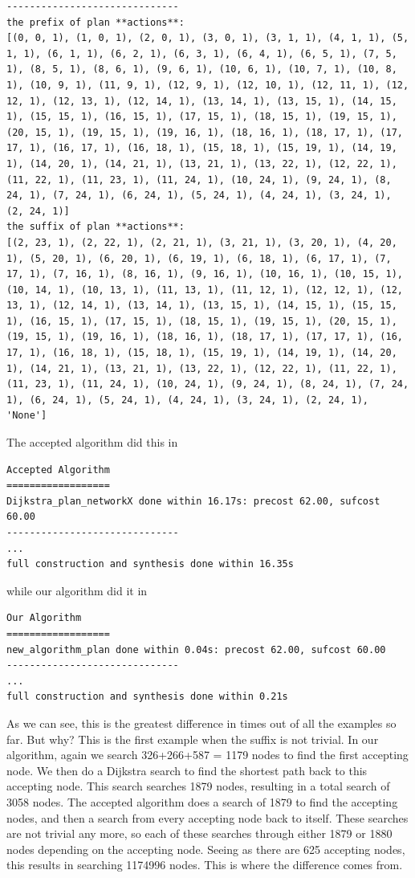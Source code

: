 \begin{lstlisting}
------------------------------
the prefix of plan **actions**:
[(0, 0, 1), (1, 0, 1), (2, 0, 1), (3, 0, 1), (3, 1, 1), (4, 1, 1), (5, 1, 1), (6, 1, 1), (6, 2, 1), (6, 3, 1), (6, 4, 1), (6, 5, 1), (7, 5, 1), (8, 5, 1), (8, 6, 1), (9, 6, 1), (10, 6, 1), (10, 7, 1), (10, 8, 1), (10, 9, 1), (11, 9, 1), (12, 9, 1), (12, 10, 1), (12, 11, 1), (12, 12, 1), (12, 13, 1), (12, 14, 1), (13, 14, 1), (13, 15, 1), (14, 15, 1), (15, 15, 1), (16, 15, 1), (17, 15, 1), (18, 15, 1), (19, 15, 1), (20, 15, 1), (19, 15, 1), (19, 16, 1), (18, 16, 1), (18, 17, 1), (17, 17, 1), (16, 17, 1), (16, 18, 1), (15, 18, 1), (15, 19, 1), (14, 19, 1), (14, 20, 1), (14, 21, 1), (13, 21, 1), (13, 22, 1), (12, 22, 1), (11, 22, 1), (11, 23, 1), (11, 24, 1), (10, 24, 1), (9, 24, 1), (8, 24, 1), (7, 24, 1), (6, 24, 1), (5, 24, 1), (4, 24, 1), (3, 24, 1), (2, 24, 1)]
the suffix of plan **actions**:
[(2, 23, 1), (2, 22, 1), (2, 21, 1), (3, 21, 1), (3, 20, 1), (4, 20, 1), (5, 20, 1), (6, 20, 1), (6, 19, 1), (6, 18, 1), (6, 17, 1), (7, 17, 1), (7, 16, 1), (8, 16, 1), (9, 16, 1), (10, 16, 1), (10, 15, 1), (10, 14, 1), (10, 13, 1), (11, 13, 1), (11, 12, 1), (12, 12, 1), (12, 13, 1), (12, 14, 1), (13, 14, 1), (13, 15, 1), (14, 15, 1), (15, 15, 1), (16, 15, 1), (17, 15, 1), (18, 15, 1), (19, 15, 1), (20, 15, 1), (19, 15, 1), (19, 16, 1), (18, 16, 1), (18, 17, 1), (17, 17, 1), (16, 17, 1), (16, 18, 1), (15, 18, 1), (15, 19, 1), (14, 19, 1), (14, 20, 1), (14, 21, 1), (13, 21, 1), (13, 22, 1), (12, 22, 1), (11, 22, 1), (11, 23, 1), (11, 24, 1), (10, 24, 1), (9, 24, 1), (8, 24, 1), (7, 24, 1), (6, 24, 1), (5, 24, 1), (4, 24, 1), (3, 24, 1), (2, 24, 1), 'None']
\end{lstlisting} 

The accepted algorithm did this in 
\begin{lstlisting}
Accepted Algorithm
==================
Dijkstra_plan_networkX done within 16.17s: precost 62.00, sufcost 60.00
------------------------------
...
full construction and synthesis done within 16.35s 
\end{lstlisting}
while our algorithm did it in
\begin{lstlisting}
Our Algorithm
==================
new_algorithm_plan done within 0.04s: precost 62.00, sufcost 60.00
------------------------------
...
full construction and synthesis done within 0.21s 
\end{lstlisting}
As we can see, this is the greatest difference in times out of all the examples so far. But why? This is the first example when the suffix is not trivial. In our algorithm, again we search 326+266+587 = 1179 nodes to find the first accepting node. We then do a Dijkstra search to find the shortest path back to this accepting node. This search searches 1879 nodes, resulting in a total search of 3058 nodes. The accepted algorithm does a search of 1879 to find the accepting nodes, and then a search from every accepting node back to itself. These searches are not trivial any more, so each of these searches through either 1879 or 1880 nodes depending on the accepting node. Seeing as there are 625 accepting nodes, this results in searching 1174996 nodes. This is where the difference comes from. 

